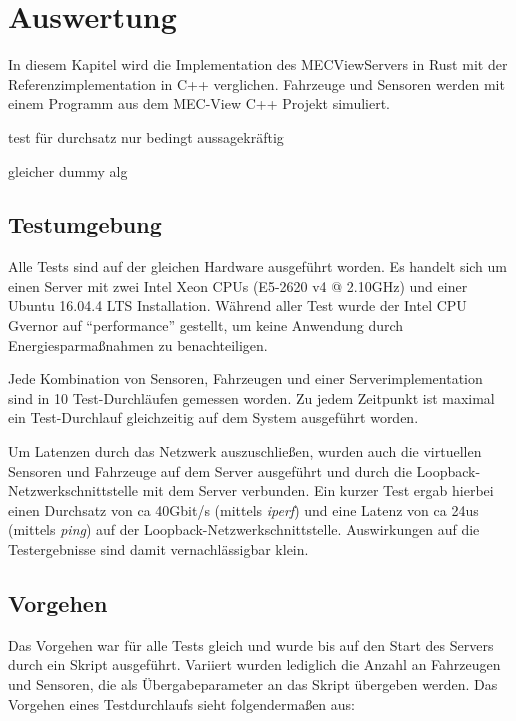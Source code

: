 
			
\chapter{Auswertung}

In diesem Kapitel wird die Implementation des MECViewServers in Rust mit der Referenzimplementation in C++ verglichen.
Fahrzeuge und Sensoren werden mit einem Programm aus dem MEC-View C++ Projekt simuliert.

test für durchsatz nur bedingt aussagekräftig

gleicher dummy alg


\section{Testumgebung}

Alle Tests sind auf der gleichen Hardware ausgeführt worden.
Es handelt sich um einen Server mit zwei Intel Xeon CPUs (E5-2620 v4 @ 2.10GHz) und einer Ubuntu 16.04.4 LTS Installation.
Während aller Test wurde der Intel CPU Gvernor auf \enquote{performance} gestellt, um keine Anwendung durch Energiesparmaßnahmen zu benachteiligen.

Jede Kombination von Sensoren, Fahrzeugen und einer Serverimplementation sind in 10 Test-Durchläufen gemessen worden.
Zu jedem Zeitpunkt ist maximal ein Test-Durchlauf gleichzeitig auf dem System ausgeführt worden.

Um Latenzen durch das Netzwerk auszuschließen, wurden auch die virtuellen Sensoren und Fahrzeuge auf dem Server ausgeführt und durch die Loopback-Netzwerkschnittstelle mit dem Server verbunden.
Ein kurzer Test ergab hierbei einen Durchsatz von ca 40Gbit/s (mittels \textit{iperf}) und eine Latenz von ca 24us (mittels \textit{ping}) auf der Loopback-Netzwerkschnittstelle.
Auswirkungen auf die Testergebnisse sind damit vernachlässigbar klein.



\section{Vorgehen}

Das Vorgehen war für alle Tests gleich und wurde bis auf den Start des Servers durch ein Skript ausgeführt.
Variiert wurden lediglich die Anzahl an Fahrzeugen und Sensoren, die als Übergabeparameter an das Skript übergeben werden.
Das Vorgehen eines Testdurchlaufs sieht folgendermaßen aus:

